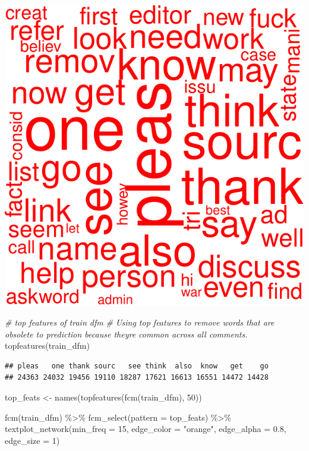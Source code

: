 \documentclass[
]{article}
\newenvironment{Shaded}{\begin{snugshade}}{\end{snugshade}}
\newcommand{\AttributeTok}[1]{\textcolor[rgb]{0.77,0.63,0.00}{#1}}
\newcommand{\CommentTok}[1]{\textcolor[rgb]{0.56,0.35,0.01}{\textit{#1}}}
\newcommand{\DecValTok}[1]{\textcolor[rgb]{0.00,0.00,0.81}{#1}}
\newcommand{\FloatTok}[1]{\textcolor[rgb]{0.00,0.00,0.81}{#1}}
\newcommand{\FunctionTok}[1]{\textcolor[rgb]{0.00,0.00,0.00}{#1}}
\newcommand{\NormalTok}[1]{#1}
\newcommand{\OtherTok}[1]{\textcolor[rgb]{0.56,0.35,0.01}{#1}}
\newcommand{\SpecialCharTok}[1]{\textcolor[rgb]{0.00,0.00,0.00}{#1}}
\newcommand{\StringTok}[1]{\textcolor[rgb]{0.31,0.60,0.02}{#1}}
\begin{document}
\includegraphics{classifier_files/figure-latex/eda-1.pdf}

\begin{Shaded}
\begin{Highlighting}[]
\CommentTok{\# top features of train dfm}
\CommentTok{\# Using top features to remove words that are obsolete to prediction because they\textquotesingle{}re common across all comments. }
\FunctionTok{topfeatures}\NormalTok{(train\_dfm)}
\end{Highlighting}
\end{Shaded}

\begin{verbatim}
## pleas   one thank sourc   see think  also  know   get    go 
## 24363 24032 19456 19110 18287 17621 16613 16551 14472 14428
\end{verbatim}

\begin{Shaded}
\begin{Highlighting}[]
\NormalTok{top\_feats }\OtherTok{\textless{}{-}} \FunctionTok{names}\NormalTok{(}\FunctionTok{topfeatures}\NormalTok{(}\FunctionTok{fcm}\NormalTok{(train\_dfm), }\DecValTok{50}\NormalTok{))}

\FunctionTok{fcm}\NormalTok{(train\_dfm) }\SpecialCharTok{\%\textgreater{}\%}
  \FunctionTok{fcm\_select}\NormalTok{(}\AttributeTok{pattern =}\NormalTok{ top\_feats) }\SpecialCharTok{\%\textgreater{}\%}
  \FunctionTok{textplot\_network}\NormalTok{(}\AttributeTok{min\_freq =} \DecValTok{15}\NormalTok{, }\AttributeTok{edge\_color =} \StringTok{"orange"}\NormalTok{, }\AttributeTok{edge\_alpha =} \FloatTok{0.8}\NormalTok{, }\AttributeTok{edge\_size =} \DecValTok{1}\NormalTok{)}
\end{Highlighting}
\end{Shaded}
\end{document}
